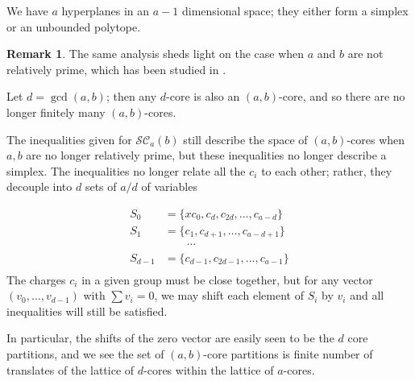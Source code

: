 \documentclass{amsart}[12pt]
\theoremstyle{definition}
\newtheorem{remark}[dummy]{Remark}
\newcommand{\DP}{\mathcal{DP}}
\newcommand{\SC}{\mathcal{SC}}
\begin{document}
We have $a$ hyperplanes in an $a-1$ dimensional space; they either
form a simplex or an unbounded polytope.



\begin{remark}  The same analysis sheds light on the case when $a$ and
  $b$ are not relatively prime, which has been studied in \cite{AKS}.

Let $d=\gcd(a,b)$; then any $d$-core is also an $(a,b)$-core, and so
there are no longer finitely many $(a,b)$-cores.

The inequalities given for $\SC_a(b)$ still describe the space of
$(a,b)$-cores when $a,b$ are no longer relatively prime, but these
inequalities no longer describe a simplex.  The inequalities no longer
relate all the $c_i$ to each other; rather, they decouple into $d$ sets of $a/d$ of variables

\begin{align*}
S_0 & =\{xc_0, c_d, c_{2d},\dots, c_{a-d}\} \\
 S_1& =\{c_1,c_{d+1},\dots, c_{a-d+1}\} \\
& \quad \quad \cdots \\
S_{d-1}&=\{c_{d-1}, c_{2d-1},\dots, c_{a-1}\} \\
\end{align*}
The charges $c_i$ in a given group must be close together, but for any
vector $(v_0,\dots, v_{d-1})$ with $\sum v_i=0$, we may shift each
element of $S_i$ by $v_i$ and all inequalities will still be satisfied.

In particular, the shifts of the zero vector are easily seen to be the
$d$ core partitions, and we see the set of $(a,b)$-core partitions is
finite number of translates of the lattice of $d$-cores within the
lattice of $a$-cores.




\end{remark}



\end{document}
